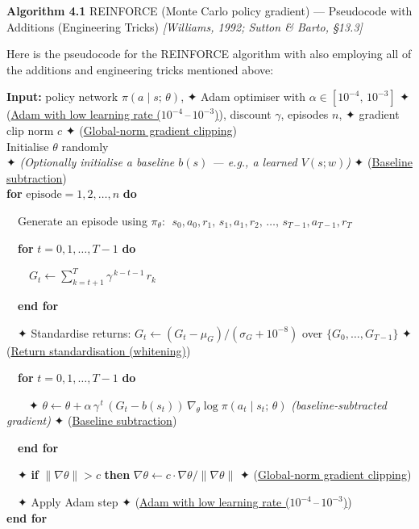 \documentclass[11pt]{article}
\begin{document}
    \begin{pseudobox}

\textbf{Algorithm 4.1} REINFORCE (Monte Carlo policy gradient) ---
Pseudocode with Additions (Engineering Tricks) \emph{{[}Williams, 1992;
Sutton \& Barto, §13.3{]}}

\tcbline

Here is the pseudocode for the REINFORCE algorithm with also employing
all of the additions and engineering tricks mentioned above:

\textbf{Input:} policy network \(\pi(a \mid s;\, \theta)\), ✦ Adam
optimiser with \(\alpha \in [10^{-4},\, 10^{-3}]\) ✦
(\hyperref[trick-4-1-3]{Adam with low learning rate
(\(10^{-4}\,\text{–}\,10^{-3}\))}), discount \(\gamma\), episodes \(n\),
✦ gradient clip norm \(c\) ✦ (\hyperref[trick-4-1-4]{Global-norm
gradient clipping})\\
Initialise \(\theta\) randomly\\
✦ \emph{(Optionally initialise a baseline \(b(s)\) --- e.g., a learned
\(V(s;w)\))} ✦ (\hyperref[trick-4-1-1]{Baseline subtraction})\\
\textbf{for} \(\text{episode} = 1, 2, \ldots, n\) \textbf{do}\\
\strut ~~Generate an episode using \(\pi_\theta\):
\(\;s_0, a_0, r_1,\, s_1, a_1, r_2,\, \ldots,\, s_{T-1}, a_{T-1}, r_T\)\\
\strut ~~\textbf{for} \(t = 0, 1, \ldots, T - 1\) \textbf{do}\\
\strut ~~~~\(G_t \leftarrow \displaystyle\sum_{k = t + 1}^{T} \gamma^{\,k - t - 1}\, r_k\)\\
\strut ~~\textbf{end for}\\
\strut ~~✦ Standardise returns:
\(G_t \leftarrow (G_t - \mu_G)/(\sigma_G + 10^{-8})\) over
\(\{G_0, \ldots, G_{T-1}\}\) ✦ (\hyperref[trick-4-1-2]{Return
standardisation (whitening)})\\
\strut ~~\textbf{for} \(t = 0, 1, \ldots, T - 1\) \textbf{do}\\
\strut ~~~~✦
\(\theta \leftarrow \theta + \alpha\, \gamma^{\,t}\,(G_t - b(s_t))\, \nabla_{\theta} \log \pi(a_t \mid s_t;\, \theta)\)
\emph{(baseline-subtracted gradient)} ✦ (\hyperref[trick-4-1-1]{Baseline
subtraction})\\
\strut ~~\textbf{end for}\\
\strut ~~✦ \textbf{if} \(\lVert\nabla\theta\rVert > c\) \textbf{then}
\(\nabla\theta \leftarrow c \cdot \nabla\theta / \lVert\nabla\theta\rVert\)
✦ (\hyperref[trick-4-1-4]{Global-norm gradient clipping})\\
\strut ~~✦ Apply Adam step ✦ (\hyperref[trick-4-1-3]{Adam with low
learning rate (\(10^{-4}\,\text{–}\,10^{-3}\))})\\
\textbf{end for}

\end{pseudobox}
\end{document}
